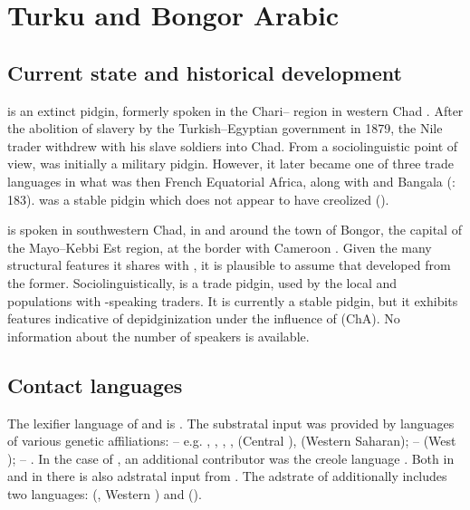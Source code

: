 \documentclass[output=paper]{langsci/langscibook}
\begin{document}
 \section{Turku and Bongor Arabic}\label{sec:tur}


 \subsection{Current state and historical development}


 is an extinct {pidgin}, formerly spoken in the Chari-- region in western Chad \citep{Muraz1926}. After the abolition of slavery by the {Turkish}--Egyptian government in 1879, the Nile  trader  withdrew with his slave soldiers into Chad. From a sociolinguistic point of view,  was initially a military {pidgin}. However, it later became one of three trade languages in what was then French Equatorial Africa, along with  and Bangala (\citealt{ToscoOwens1993}: 183).  was a stable {pidgin} which does not appear to have creolized (\citealt{ToscoOwens1993}).

  is spoken in southwestern Chad, in and around the town of Bongor, the capital of the Mayo--Kebbi Est region, at the border with Cameroon \citep{Luffin2013}. Given the many structural features it shares with , it is plausible to assume that   developed from the former. Sociolinguistically,   is a trade {pidgin}, used by the local  and  populations with -speaking traders. It is currently a stable {pidgin}, but it exhibits features indicative of depidginization under the influence of   (ChA). No information about the number of speakers is available.


 
 \subsection{Contact languages}


The {lexifier} language of  and   is  . The substratal input was provided by languages of various genetic affiliations:  – e.g. , , , ,  (Central ),  (Western Saharan);  –  (West );  – . In the case of , an additional contributor was the {creole} language . Both in  and in   there is also adstratal input from . The {adstrate} of   additionally includes two languages:  (, Western ) and  ().
\end{document}
